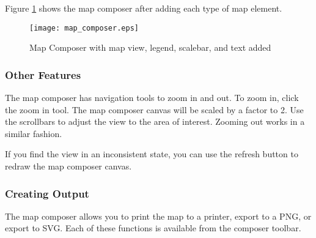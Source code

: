 Figure \ref{fig:map_composer_complete} shows the map composer after adding
each type of map element.
\begin{figure}[h]
   \begin{center}
   \caption{Map Composer with map view, legend, scalebar, and text added}\label{fig:map_composer_complete}\smallskip
   \texttt{[image: map\_composer.eps]}
\end{center}  
\end{figure}

\subsubsection{Other Features}

The map composer has navigation tools to zoom in and out. To zoom in, click
the zoom in tool. The map composer canvas will be scaled by a factor to 2. Use
the scrollbars to adjust the view to the area of interest. Zooming out works
in a similar fashion.

If you find the view in an inconsistent state, you can use the refresh button
to redraw the map composer canvas.

\subsubsection{Creating Output}

The map composer allows you to print the map to a printer, export to a PNG, or
export to SVG. Each of these functions is available from the composer toolbar.

